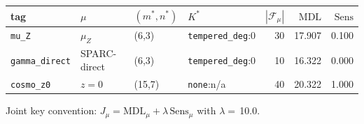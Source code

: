 \begin{center}
\scriptsize
\setlength{\tabcolsep}{6pt}
\renewcommand{\arraystretch}{1.15}
\begin{tabular}{llllrrr}
\toprule
tag & $\mu$ & $(m^\ast,n^\ast)$ & $K^\ast$ & $|\mathcal{F}_\mu|$ & $\mathrm{MDL}$ & $\mathrm{Sens}$ \\
\midrule
\texttt{mu\_Z} & $\mu_Z$ & (6,3) & \texttt{tempered\_deg}:0 & 30 & 17.907 & 0.100 \\
\texttt{gamma\_direct} & SPARC-direct & (6,3) & \texttt{tempered\_deg}:0 & 10 & 16.322 & 0.000 \\
\texttt{cosmo\_z0} & $z=0$ & (15,7) & \texttt{none}:n/a & 40 & 20.322 & 1.000 \\
\bottomrule
\end{tabular}
\end{center}
\noindent\AuditTag Joint key convention: $J_\mu=\mathrm{MDL}_\mu+\lambda\,\mathrm{Sens}_\mu$ with $\lambda=\,$10.0.